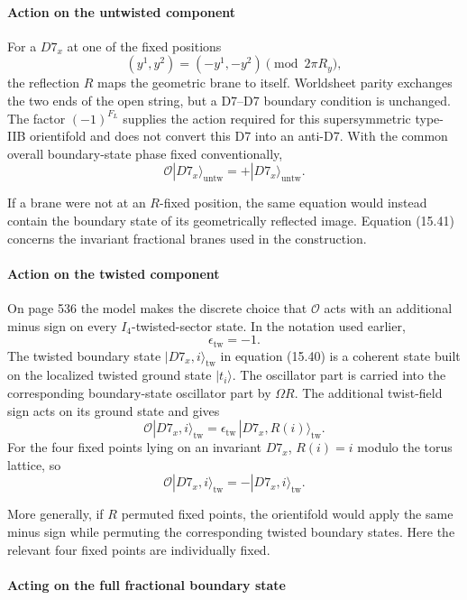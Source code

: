 \documentclass[
  10pt,
  a4paper,
  openany]{book}
\begin{document}
\paragraph{Action on the untwisted
component}\label{action-on-the-untwisted-component}

For a \(D7_x\) at one of the fixed positions \[
(y^1,y^2)
=
(-y^1,-y^2)
\pmod{2\pi R_y},
\] the reflection \(R\) maps the geometric brane to itself. Worldsheet
parity exchanges the two ends of the open string, but a D7--D7 boundary
condition is unchanged. The factor \((-1)^{F_L}\) supplies the action
required for this supersymmetric type-IIB orientifold and does not
convert this D7 into an anti-D7. With the common overall boundary-state
phase fixed conventionally, \[
\boxed{
\mathcal O
|D7_x\rangle_{\mathrm{untw}}
=
+|D7_x\rangle_{\mathrm{untw}}.
}
\]

If a brane were not at an \(R\)-fixed position, the same equation would
instead contain the boundary state of its geometrically reflected image.
Equation (15.41) concerns the invariant fractional branes used in the
construction.

\paragraph{Action on the twisted
component}\label{action-on-the-twisted-component}

On page 536 the model makes the discrete choice that \(\mathcal O\) acts
with an additional minus sign on every \(I_4\)-twisted-sector state. In
the notation used earlier, \[
\epsilon_{\mathrm{tw}}
=
-1.
\] The twisted boundary state \(|D7_x,i\rangle_{\mathrm{tw}}\) in
equation (15.40) is a coherent state built on the localized twisted
ground state \(|t_i\rangle\). The oscillator part is carried into the
corresponding boundary-state oscillator part by \(\Omega R\). The
additional twist-field sign acts on its ground state and gives \[
\mathcal O
|D7_x,i\rangle_{\mathrm{tw}}
=
\epsilon_{\mathrm{tw}}\,
|D7_x,R(i)\rangle_{\mathrm{tw}}.
\] For the four fixed points lying on an invariant \(D7_x\), \(R(i)=i\)
modulo the torus lattice, so \[
\boxed{
\mathcal O
|D7_x,i\rangle_{\mathrm{tw}}
=
-|D7_x,i\rangle_{\mathrm{tw}}.
}
\]

More generally, if \(R\) permuted fixed points, the orientifold would
apply the same minus sign while permuting the corresponding twisted
boundary states. Here the relevant four fixed points are individually
fixed.

\paragraph{Acting on the full fractional boundary
state}\label{acting-on-the-full-fractional-boundary-state}
\end{document}

